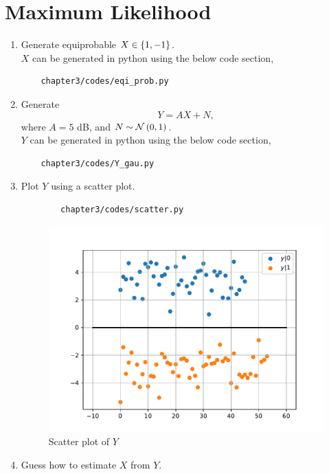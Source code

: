 
\section{Maximum Likelihood}
\begin{enumerate}
\item Generate equiprobable $X \in \left\{1,-1\right\}$.\\
\solution $X$ can be generated in python using the below code section,
\begin{lstlisting}
	chapter3/codes/eqi_prob.py
\end{lstlisting}
\item Generate 
\begin{equation}
Y = AX+N,
\end{equation}
where $A = 5$ dB,  and $N \sim \mathcal{N}\left(0,1\right)$.\\
\solution $Y$ can be generated in python using the below code section,
\begin{lstlisting}
	chapter3/codes/Y_gau.py
\end{lstlisting}
\item Plot $Y$ using a scatter plot.\\
\solution 
\begin{lstlisting}
		chapter3/codes/scatter.py
\end{lstlisting}
\begin{figure}[H]
\centering
\includegraphics[width=\columnwidth]{chapter3/figs/bpsk_scatter.pdf}
\caption{Scatter plot of $Y$}
\label{fig:bpsk_scatter}
\end{figure}
\item Guess how to estimate $X$ from $Y$.\\

\end{enumerate}
